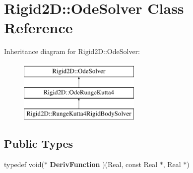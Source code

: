 \hypertarget{class_rigid2_d_1_1_ode_solver}{
\section{Rigid2D::OdeSolver Class Reference}
\label{class_rigid2_d_1_1_ode_solver}
}
Inheritance diagram for Rigid2D::OdeSolver:\begin{figure}[H]
\begin{center}
\leavevmode
\includegraphics[height=3cm]{class_rigid2_d_1_1_ode_solver}
\end{center}
\end{figure}
\subsection*{Public Types}
\begin{DoxyCompactItemize}
\item 
\hypertarget{class_rigid2_d_1_1_ode_solver_ac375b33ae2cc32b12674f534bf2c21cd}{
typedef void($\ast$ {\bfseries DerivFunction} )(Real, const Real $\ast$, Real $\ast$)}
\label{class_rigid2_d_1_1_ode_solver_ac375b33ae2cc32b12674f534bf2c21cd}

\end{DoxyCompactItemize}
